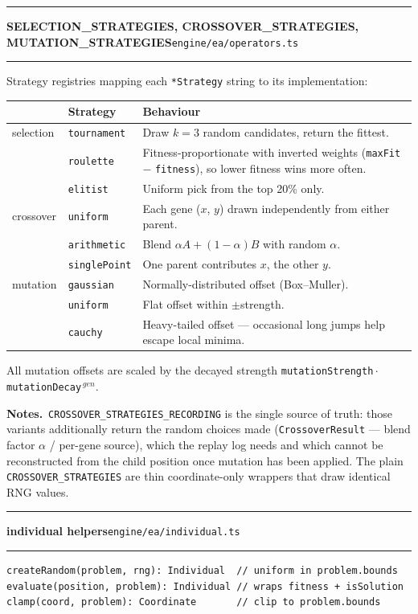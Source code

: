 \documentclass[11pt,a4paper]{report}
\newcommand{\srcfile}[1]{\texttt{\small #1}}   %
\newcommand{\ts}[1]{\texttt{#1}}               %
\newenvironment{apientry}[2]{%
  \par\medskip\noindent
  \begin{minipage}{\textwidth}
  \hrule\vspace{0.6ex}
  {\large\ttfamily\bfseries #1}\hfill{\footnotesize\srcfile{#2}}
  \vspace{0.4ex}\hrule\medskip
}{%
  \end{minipage}\par\medskip
}
\newcommand{\apifield}[1]{\par\smallskip\noindent\textbf{#1.}\ }
\begin{document}
\begin{apientry}{SELECTION\_STRATEGIES, CROSSOVER\_STRATEGIES,
MUTATION\_STRATEGIES}{engine/ea/operators.ts}
Strategy registries mapping each \ts{*Strategy} string to its
implementation:
\begin{center}
\begin{tabularx}{\textwidth}{l l X}
  \toprule
  & \textbf{Strategy} & \textbf{Behaviour} \\
  \midrule
  selection & \ts{tournament}  & Draw $k = 3$ random candidates, return the fittest. \\
            & \ts{roulette}    & Fitness-proportionate with inverted weights
                                 (\ts{maxFit} $-$ \ts{fitness}), so lower
                                 fitness wins more often. \\
            & \ts{elitist}     & Uniform pick from the top 20\% only. \\
  crossover & \ts{uniform}     & Each gene ($x$, $y$) drawn independently from either parent. \\
            & \ts{arithmetic}  & Blend $\alpha A + (1-\alpha) B$ with random $\alpha$. \\
            & \ts{singlePoint} & One parent contributes $x$, the other $y$. \\
  mutation  & \ts{gaussian}    & Normally-distributed offset (Box--Muller). \\
            & \ts{uniform}     & Flat offset within $\pm$strength. \\
            & \ts{cauchy}      & Heavy-tailed offset --- occasional long
                                 jumps help escape local minima. \\
  \bottomrule
\end{tabularx}
\end{center}
All mutation offsets are scaled by the decayed strength
\ts{mutationStrength}\,$\cdot$\,\ts{mutationDecay}$^{\,gen}$.
\apifield{Notes}\ts{CROSSOVER\_STRATEGIES\_RECORDING} is the single source
of truth: those variants additionally return the random choices made
(\ts{CrossoverResult} --- blend factor $\alpha$ / per-gene source), which
the replay log needs and which cannot be reconstructed from the child
position once mutation has been applied. The plain
\ts{CROSSOVER\_STRATEGIES} are thin coordinate-only wrappers that draw
identical RNG values.
\end{apientry}

\begin{apientry}{individual helpers}{engine/ea/individual.ts}
\begin{lstlisting}
createRandom(problem, rng): Individual  // uniform in problem.bounds
evaluate(position, problem): Individual // wraps fitness + isSolution
clamp(coord, problem): Coordinate       // clip to problem.bounds
\end{lstlisting}
\end{apientry}
\end{document}
